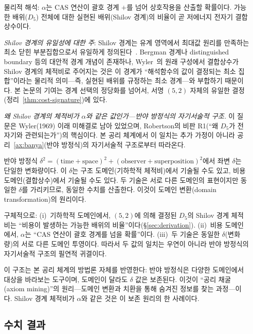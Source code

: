 \documentclass[entropy,article,submit,pdftex,oneauthor]{Definitions/mdpi}
\begin{document}
물리적 해석: $\alpha$는 CAS 연산이 괄호 경계 $+$를 넘어 상호작용을 산출할 확률이다. 가능한 배위($D_5$) 전체에 대한 실현된 배위(Shilov 경계)의 비율이 곧 저에너지 전자기 결합상수이다.

\textit{Shilov 경계의 유일성에 대한 주}: Shilov 경계는 유계 영역에서 최대값 원리를 만족하는 최소 닫힌 부분집합으로서 유일하게 정의된다~\cite{hua1963}. Bergman 경계나 distinguished boundary 등의 대안적 경계 개념이 존재하나, Wyler~\cite{wyler1969}의 원래 구성에서 결합상수가 Shilov 경계의 체적비로 주어지는 것은 이 경계가 ``해석함수의 값이 결정되는 최소 집합''이라는 물리적 의미---즉, 실현된 배위를 규정하는 최소 경계---와 부합하기 때문이다. 본 논문의 기여는 경계 선택의 정당화를 넘어서, 서명 $(5,2)$ 자체의 유일한 결정(정리~\ref{thm:cost-signature})에 있다.

\textit{왜 Shilov 경계의 체적비가 $\alpha$와 같은 값인가---반야 방정식의 자기서술적 구조.} 이 질문은 Wyler(1969) 이래 미해결로 남아 있었으며, Robertson의 비판 R1(``왜 $D_5$가 전자기와 관련되는가'')의 핵심이다. 본 공리 체계에서 이 일치는 추가 가정이 아니라 공리~\ref{ax:banya}(반야 방정식)의 자기서술적 구조로부터 따라온다.

반야 방정식 $\delta^2 = (\mathrm{time} + \mathrm{space})^2 + (\mathrm{observer} + \mathrm{superposition})^2$에서 좌변 $\delta$는 단일한 변화량이다. 이 $\delta$는 구조 도메인(기하학적 체적비)에서 기술될 수도 있고, 비용 도메인(결합상수)에서 기술될 수도 있다. 두 기술은 서로 다른 도메인의 표현이지만 동일한 $\delta$를 가리키므로, 동일한 수치를 산출한다. 이것이 도메인 변환(domain transformation)의 원리이다.

구체적으로: (i)~기하학적 도메인에서, $(5,2)$에 의해 결정된 $D_5$의 Shilov 경계 체적비는 ``비용이 발생하는 가능한 배위의 비율''이다(§\ref{sec:derivation}). (ii)~비용 도메인에서, $\alpha$는 ``CAS 연산이 괄호 경계를 넘을 확률''이다. (iii)~두 기술은 동일한 $\delta$(변화량)의 서로 다른 도메인 투영이다. 따라서 두 값의 일치는 우연이 아니라 반야 방정식의 자기서술적 구조의 필연적 귀결이다.

이 구조는 본 공리 체계의 방법론 자체를 반영한다: 반야 방정식은 다양한 도메인에서 대상을 바라보는 도구이며, 도메인이 달라도 $\delta$ 값은 보존된다. 이것이 ``공리 채굴(axiom mining)''의 원리---도메인 변환과 치환을 통해 숨겨진 정보를 찾는 과정---이다. Shilov 경계 체적비가 $\alpha$와 같은 것은 이 보존 원리의 한 사례이다.

\subsection{수치 결과}
\end{document}
